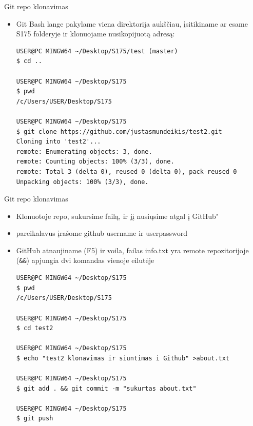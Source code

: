 \documentclass[11pt,xcolor=table]{beamer}
\begin{document}

\begin{frame}[fragile]{Git repo klonavimas}
\begin{itemize}
\item Git Bash lange pakylame viena direktorija aukščiau, įsitikiname ar esame S175 folderyje ir klonuojame nusikopijuotą adresą:
\begin{lstlisting}
USER@PC MINGW64 ~/Desktop/S175/test (master)
$ cd ..

USER@PC MINGW64 ~/Desktop/S175
$ pwd
/c/Users/USER/Desktop/S175

USER@PC MINGW64 ~/Desktop/S175
$ git clone https://github.com/justasmundeikis/test2.git
Cloning into 'test2'...
remote: Enumerating objects: 3, done.
remote: Counting objects: 100% (3/3), done.
remote: Total 3 (delta 0), reused 0 (delta 0), pack-reused 0
Unpacking objects: 100% (3/3), done.
\end{lstlisting}
\end{itemize}
\end{frame}



\begin{frame}[fragile]{Git repo klonavimas}
\begin{itemize}
\item Klonuotoje repo, sukursime failą, ir jį nusiųsime atgal į GitHub"
\item pareikalavus įrašome github username ir userpassword
\item GitHub atnaujiname (F5) ir voila, failas info.txt yra remote repozitorijoje (\colorbox{listinggray}{\lstinline|&&|}) apjungia dvi komandas vienoje eilutėje
\begin{lstlisting}
USER@PC MINGW64 ~/Desktop/S175
$ pwd
/c/Users/USER/Desktop/S175

USER@PC MINGW64 ~/Desktop/S175
$ cd test2

USER@PC MINGW64 ~/Desktop/S175
$ echo "test2 klonavimas ir siuntimas i Github" >about.txt

USER@PC MINGW64 ~/Desktop/S175
$ git add . && git commit -m "sukurtas about.txt"

USER@PC MINGW64 ~/Desktop/S175
$ git push
\end{lstlisting}

\end{itemize}
\end{frame}
\end{document}
